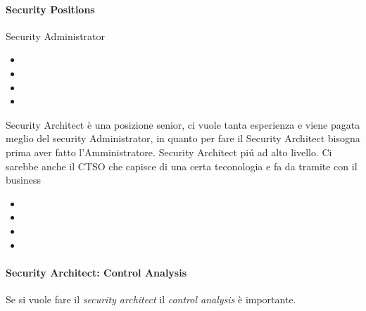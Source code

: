 

\paragraph{Security Positions} 
Security Administrator

\begin{itemize}
\item 
\item 
\item
\item 
\end{itemize}
Security Architect è una posizione senior, ci vuole tanta esperienza e viene 
pagata meglio del security Administrator, in quanto per fare il Security 
Architect bisogna prima aver fatto l'Amministratore. 
Security Architect piú ad alto livello. Ci sarebbe anche il CTSO che capisce di 
una certa teconologia e fa da tramite con il business
\begin{itemize}
\item 
\item 
\item
\item 
\end{itemize}
\paragraph{Security Architect: Control Analysis}

Se si vuole fare il \textit{security architect} il \textit{control analysis} è 
importante.

